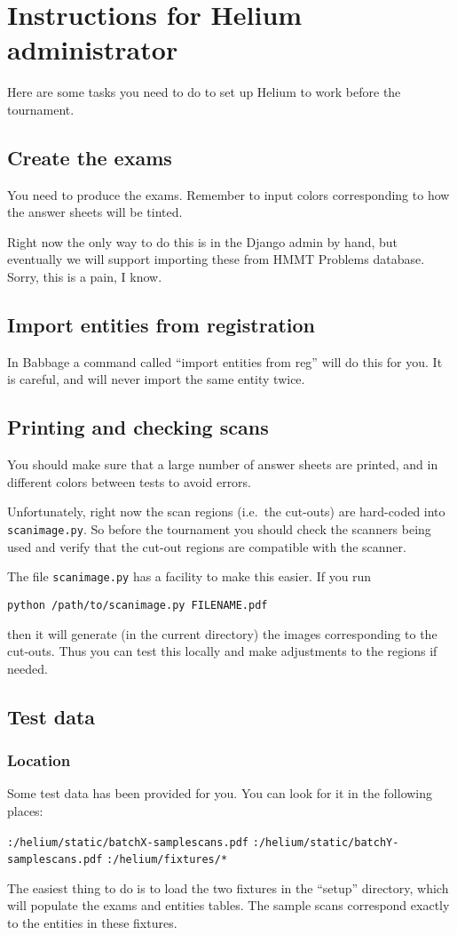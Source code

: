 \chapter{Instructions for Helium administrator}
Here are some tasks you need to do to set up Helium
to work before the tournament.

\section{Create the exams}
You need to produce the exams.
Remember to input colors corresponding to how the answer sheets will be tinted.

Right now the only way to do this is in the Django admin by hand,
but eventually we will support importing these from HMMT Problems database.
Sorry, this is a pain, I know.

\section{Import entities from registration}
In Babbage a command called ``import entities from reg'' will do this for you.
It is careful, and will never import the same entity twice.

\section{Printing and checking scans}
You should make sure that a large number of answer sheets are printed,
and in different colors between tests to avoid errors.

Unfortunately, right now the scan regions (i.e.\ the cut-outs)
are hard-coded into \verb+scanimage.py+.
So before the tournament you should check the scanners being used
and verify that the cut-out regions are compatible with the scanner.

The file \verb+scanimage.py+ has a facility to make this easier.
If you run
\begin{center}
\verb+python /path/to/scanimage.py FILENAME.pdf+
\end{center}
then it will generate (in the current directory)
the images corresponding to the cut-outs.
Thus you can test this locally and make adjustments to the regions if needed.

\section{Test data}
\subsection{Location}
Some test data has been provided for you.
You can look for it in the following places:
\begin{itemize}
	\ii \verb+:/helium/static/batchX-samplescans.pdf+
	\ii \verb+:/helium/static/batchY-samplescans.pdf+
	\ii \verb+:/helium/fixtures/*+
\end{itemize}
The easiest thing to do is to load the two fixtures in the ``setup'' directory,
which will populate the exams and entities tables.
The sample scans correspond exactly to the entities in these fixtures.

